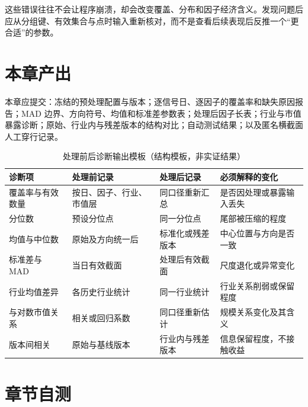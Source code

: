 这些错误往往不会让程序崩溃，却会改变覆盖、分布和因子经济含义。发现问题后应从分组键、有效集合与点时输入重新核对，而不是查看后续表现后反推一个“更合适”的参数。

\section{本章产出}

\begin{outputbox}
本章应提交：冻结的预处理配置与版本；逐信号日、逐因子的覆盖率和缺失原因报告；MAD 边界、方向符号、均值和标准差参数表；处理后因子长表；行业与市值暴露诊断；原始、行业内与残差版本的结构对比；自动测试结果；以及匿名横截面人工穿行记录。
\end{outputbox}

\begin{table}[htbp]
  \centering
  \small
  \caption{处理前后诊断输出模板（结构模板，非实证结果）}
  \label{tab:ch05-diagnostic-template}
  \begin{tabularx}{\textwidth}{p{3.1cm} Y Y Y}
    \toprule
    诊断项 & 处理前记录 & 处理后记录 & 必须解释的变化 \\
    \midrule
    覆盖率与有效数量 & 按日、因子、行业、市值层 & 同口径重新汇总 & 是否因处理或暴露输入丢失 \\
    分位数 & 预设分位点 & 同一分位点 & 尾部被压缩的程度 \\
    均值与中位数 & 原始及方向统一后 & 标准化或残差版本 & 中心位置与方向是否一致 \\
    标准差与 MAD & 当日有效截面 & 处理后有效截面 & 尺度退化或异常变化 \\
    行业均值差异 & 各历史行业统计 & 同一行业统计 & 行业关系削弱或保留程度 \\
    与对数市值关系 & 相关或回归系数 & 同口径重新估计 & 规模关系变化及其含义 \\
    版本间相关 & 原始与基线版本 & 行业内与残差版本 & 信息保留程度，不接触收益 \\
    \bottomrule
  \end{tabularx}
\end{table}

\section{章节自测}

